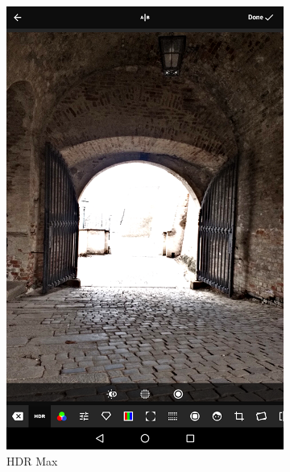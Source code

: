 \begin{figure}[t]
    \centering
    \begin{subfigure}{0.4\textwidth}
        \includegraphics[width=\textwidth]{figures/ui/apps/uiHdrMax}
        \caption{HDR Max}
        \label{fig:appsUI_3}
    \end{subfigure}
    ~
    \begin{subfigure}{0.4\textwidth}

\end{subfigure}
\end{figure}
